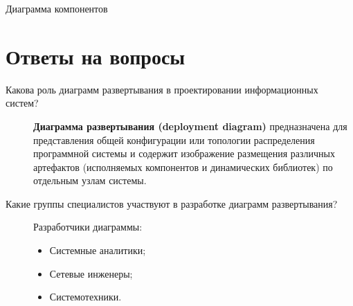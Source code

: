 \begin{image}
	\caption{Диаграмма компонентов}
	\label{fig:deployments}
\end{image}

\clearpage

\section*{Ответы на вопросы}

\begin{description}
	\item [Какова роль диаграмм развертывания в проектировании
		информационных систем?]
		\textbf{Диаграмма развертывания (deployment diagram)} предназначена
		для представления общей конфигурации или топологии распределения
		программной системы и содержит изображение размещения различных
		артефактов (исполняемых компонентов и динамических библиотек) по
		отдельным узлам системы.
	\item [Какие группы специалистов участвуют в разработке диаграмм
		развертывания?]
		Разработчики диаграммы:

		\begin{itemize}
			\item Системные аналитики;
			\item Сетевые инженеры;
			\item Системотехники.
		\end{itemize}


\end{description}

